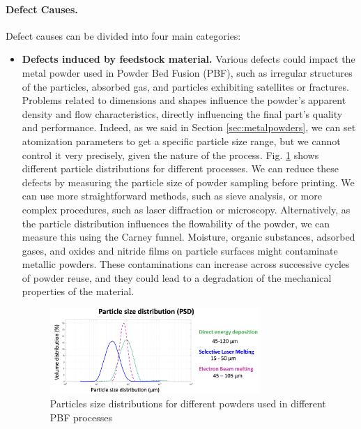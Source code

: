 \paragraph{Defect Causes.} Defect causes can be divided into four main categories:
\begin{itemize}
    \item \textbf{Defects induced by feedstock material.} Various defects could impact the metal powder used in Powder Bed Fusion (PBF), such as irregular structures of the particles, absorbed gas, and particles exhibiting satellites or fractures. Problems related to dimensions and shapes influence the powder's apparent density and flow characteristics, directly influencing the final part's quality and performance. Indeed, as we said in Section \ref{sec:metalpowders}, we can set atomization parameters to get a specific particle size range, but we cannot control it very precisely, given the nature of the process. Fig. \ref{fig:particlesdistributions} shows different particle distributions for different processes. We can reduce these defects by measuring the particle size of powder sampling before printing. We can use more straightforward methods, such as sieve analysis, or more complex procedures, such as laser diffraction or microscopy. Alternatively, as the particle distribution influences the flowability of the powder, we can measure this using the Carney funnel. Moisture, organic substances, adsorbed gases, and oxides and nitride films on particle surfaces might contaminate metallic powders. These contaminations can increase across successive cycles of powder reuse, and they could lead to a degradation of the mechanical properties of the material.
\begin{figure}
    \centering
    \includegraphics[width=0.75\textwidth]{Images/particlesdistributions.png}
    \caption[Particles distribution.]{Particles size distributions for different powders used in different PBF processes}
    \label{fig:particlesdistributions}
\end{figure}

\end{itemize}
